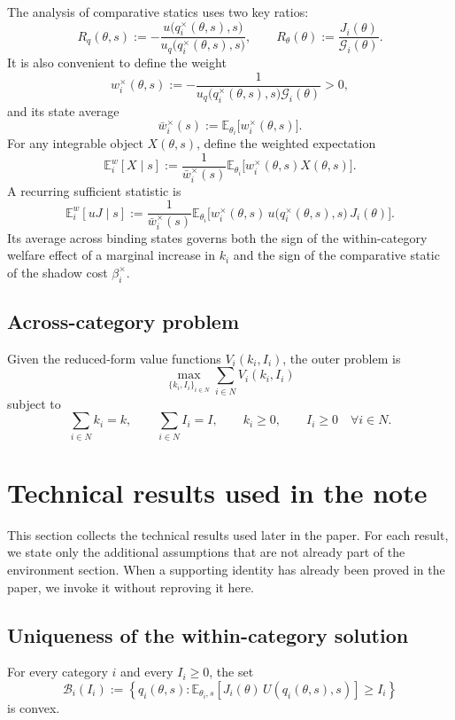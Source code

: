 \documentclass[master.tex]{subfiles}
\begin{document}
The analysis of comparative statics uses two key ratios:
\[
R_q(\theta,s) := -\frac{u\bigl(q_i^{\times}(\theta,s),s\bigr)}{u_q\bigl(q_i^{\times}(\theta,s),s\bigr)}, \qquad R_\theta(\theta) := \frac{J_i(\theta)}{\mathcal G_i(\theta)}.
\]
It is also convenient to define the weight
\[
w_i^{\times}(\theta,s) := -\frac{1}{u_q\bigl(q_i^{\times}(\theta,s),s\bigr)\mathcal G_i(\theta)} >0,
\]
and its state average
\[
\bar w_i^{\times}(s) := \mathbb E_{\theta_i}\bigl[w_i^{\times}(\theta,s)\bigr].
\]
For any integrable object $X(\theta,s)$, define the weighted expectation
\[
\mathbb E_i^w[X\mid s] := \frac{1}{\bar w_i^{\times}(s)} \mathbb E_{\theta_i}\bigl[w_i^{\times}(\theta,s)X(\theta,s)\bigr].
\]
A recurring sufficient statistic is
\[
\mathbb E_i^w[uJ\mid s] := \frac{1}{\bar w_i^{\times}(s)} \mathbb E_{\theta_i}\bigl[w_i^{\times}(\theta,s) \,u\bigl(q_i^{\times}(\theta,s),s\bigr) \,J_i(\theta) \bigr].
\]
Its average across binding states governs both the sign of the within-category welfare effect of a marginal increase in $k_i$ and the sign of the comparative static of the shadow cost $\beta_i^{\times}$.

\subsection{Across-category problem}

Given the reduced-form value functions $V_i(k_i,I_i)$, the outer problem is
\[
\max_{\{k_i,I_i\}_{i\in N}} \sum_{i\in N} V_i(k_i,I_i)
\]
subject to
\[
\sum_{i\in N} k_i = k, \qquad \sum_{i\in N} I_i = I, \qquad k_i\ge 0, \qquad I_i\ge 0 \quad \forall i\in N.
\]

\section{Technical results used in the note}

This section collects the technical results used later in the paper.
For each result, we state only the additional assumptions that are not
already part of the environment section. When a supporting identity has
already been proved in the paper, we invoke it without reproving it here.

\subsection{Uniqueness of the within-category solution}

\begin{assumption}
For every category $i$ and every $I_i\ge 0$, the set
\[
\mathcal B_i(I_i)
:=
\left\{
q_i(\theta,s):
\mathbb E_{\theta_i,s}\!\left[J_i(\theta)\,U(q_i(\theta,s),s)\right]\ge I_i
\right\}
\]
is convex.
\end{assumption}
\end{document}
